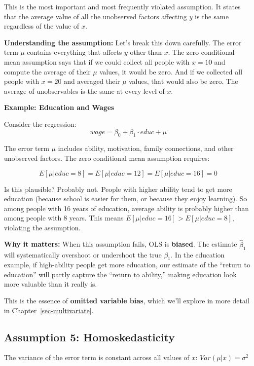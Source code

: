 \documentclass[
  letterpaper,
  DIV=11,
  numbers=noendperiod]{scrreprt}
\begin{document}
This is the most important and most frequently violated assumption. It
states that the average value of all the unobserved factors affecting
\(y\) is the same regardless of the value of \(x\).

\textbf{Understanding the assumption:} Let's break this down carefully.
The error term \(\mu\) contains everything that affects \(y\) other than
\(x\). The zero conditional mean assumption says that if we could
collect all people with \(x = 10\) and compute the average of their
\(\mu\) values, it would be zero. And if we collected all people with
\(x = 20\) and averaged their \(\mu\) values, that would also be zero.
The average of unobservables is the same at every level of \(x\).

\textbf{Example: Education and Wages}

Consider the regression: \[wage = \beta_0 + \beta_1 \cdot educ + \mu\]

The error term \(\mu\) includes ability, motivation, family connections,
and other unobserved factors. The zero conditional mean assumption
requires:

\[E[\mu | educ = 8] = E[\mu | educ = 12] = E[\mu | educ = 16] = 0\]

Is this plausible? Probably not. People with higher ability tend to get
more education (because school is easier for them, or because they enjoy
learning). So among people with 16 years of education, average ability
is probably higher than among people with 8 years. This means
\(E[\mu | educ = 16] > E[\mu | educ = 8]\), violating the assumption.

\textbf{Why it matters:} When this assumption fails, OLS is
\textbf{biased}. The estimate \(\hat{\beta}_1\) will systematically
overshoot or undershoot the true \(\beta_1\). In the education example,
if high-ability people get more education, our estimate of the ``return
to education'' will partly capture the ``return to ability,'' making
education look more valuable than it really is.

This is the essence of \textbf{omitted variable bias}, which we'll
explore in more detail in Chapter~\ref{sec-multivariate}.

\subsection{Assumption 5:
Homoskedasticity}\label{assumption-5-homoskedasticity}

\begin{tcolorbox}[enhanced jigsaw, arc=.35mm, bottomrule=.15mm, bottomtitle=1mm, breakable, colback=white, colbacktitle=quarto-callout-note-color!10!white, colframe=quarto-callout-note-color-frame, coltitle=black, left=2mm, leftrule=.75mm, opacityback=0, opacitybacktitle=0.6, rightrule=.15mm, title=\textcolor{quarto-callout-note-color}{\faInfo}\hspace{0.5em}{Gauss-Markov Assumption 5: Homoskedasticity}, titlerule=0mm, toprule=.15mm, toptitle=1mm]

The variance of the error term is constant across all values of \(x\):
\(Var(\mu | x) = \sigma^2\)

\end{tcolorbox}
\end{document}

